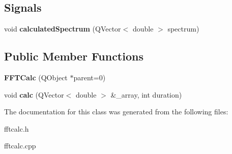 \subsection*{Signals}
\begin{DoxyCompactItemize}
\item 
\hypertarget{class_f_f_t_calc_a2c21488cc4fa4985f9152156137db30e}{void {\bfseries calculated\-Spectrum} (Q\-Vector$<$ double $>$ spectrum)}\label{class_f_f_t_calc_a2c21488cc4fa4985f9152156137db30e}

\end{DoxyCompactItemize}
\subsection*{Public Member Functions}
\begin{DoxyCompactItemize}
\item 
\hypertarget{class_f_f_t_calc_ae6b220dd66a6df99041680e55746c79e}{{\bfseries F\-F\-T\-Calc} (Q\-Object $\ast$parent=0)}\label{class_f_f_t_calc_ae6b220dd66a6df99041680e55746c79e}

\item 
\hypertarget{class_f_f_t_calc_a19ee0f470123aaff939fc6c1ee833080}{void {\bfseries calc} (Q\-Vector$<$ double $>$ \&\-\_\-array, int duration)}\label{class_f_f_t_calc_a19ee0f470123aaff939fc6c1ee833080}

\end{DoxyCompactItemize}


The documentation for this class was generated from the following files\-:\begin{DoxyCompactItemize}
\item 
fftcalc.\-h\item 
fftcalc.\-cpp\end{DoxyCompactItemize}

